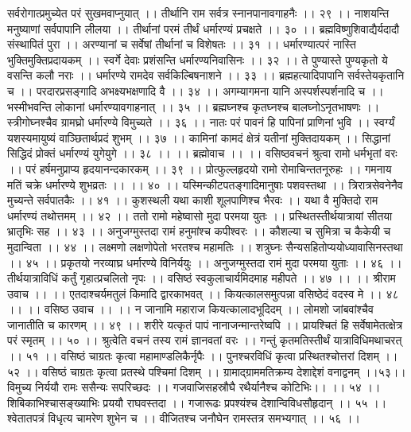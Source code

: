 सर्वरोगात्प्रमुच्येत परं सुखमवाप्नुयात् ।।
तीर्थानि राम सर्वत्र स्नानपानावगाहनैः ।। २९ ।।
नाशयन्ति मनुष्याणां सर्वपापानि लीलया ।।
तीर्थानां परमं तीर्थं धर्मारण्यं प्रचक्षते ।। ३० ।।
ब्रह्मविष्णुशिवाद्यैर्यदादौ संस्थापितं पुरा ।।
अरण्यानां च सर्वेषां तीर्थानां च विशेषतः ।। ३१ ।।
धर्मारण्यात्परं नास्ति भुक्तिमुक्तिप्रदायकम् ।।
स्वर्गे देवाः प्रशंसन्ति धर्मारण्यनिवासिनः ।। ३२ ।।
ते पुण्यास्ते पुण्यकृतो ये वसन्ति कलौ नराः ।।
धर्मारण्ये रामदेव सर्वकिल्बिषनाशने ।। ३३ ।।
ब्रह्महत्यादिपापानि सर्वस्तेयकृतानि च ।।
परदारप्रसङ्गादि अभक्ष्यभक्षणादि वै ।। ३४ ।।
अगम्यागमना यानि अस्पर्शस्पर्शनादि च ।।
भस्मीभवन्ति लोकानां धर्मारण्यावगाहनात् ।। ३५ ।।
ब्रह्मघ्नश्च कृतघ्नश्च बालघ्नोऽनृतभाषणः ।।
स्त्रीगोघ्नश्चैव ग्रामघ्रो धर्मारण्ये विमुच्यते ।। ३६ ।।
नातः परं पावनं हि पापिनां प्राणिनां भुवि ।।
स्वर्ग्यं यशस्यमायुष्यं वाञ्छितार्थप्रदं शुभम् ।। ३७ ।।
कामिनां कामदं क्षेत्रं यतीनां मुक्तिदायकम् ।।
सिद्धानां सिद्धिदं प्रोक्तं धर्मारण्यं युगेयुगे ।। ३८ ।।
।। ब्रह्मोवाच ।। ।।
वसिष्ठवचनं श्रुत्वा रामो धर्मभृतां वरः ।।
परं हर्षमनुप्राप्य हृदयानन्दकारकम् ।। ३९ ।।
प्रोत्फुल्लहृदयो रामो रोमाचिन्ततनूरुहः ।।
गमनाय मतिं चक्रे धर्मारण्ये शुभव्रतः ।। ।। ४० ।।
यस्मिन्कीटपतङ्गादिमानुषाः पशवस्तथा ।।
त्रिरात्रसेवनेनैव मुच्यन्ते सर्वपातकैः ।। ४१ ।।
कुशस्थली यथा काशी शूलपाणिश्च भैरवः ।।
यथा वै मुक्तिदो राम धर्मारण्यं तथोत्तमम् ।। ४२ ।।
ततो रामो महेष्वासो मुदा परमया युतः ।।
प्रस्थितस्तीर्थयात्रायां सीतया भ्रातृभिः सह ।। ४३ ।।
अनुजग्मुस्तदा रामं हनुमांश्च कपीश्वरः ।।
कौशल्या च सुमित्रा च कैकेयी च मुदान्विता ।। ४४ ।।
लक्ष्मणो लक्षणोपेतो भरतश्च महामतिः ।।
शत्रुघ्नः सैन्यसहितोप्ययोध्यावासिनस्तथा ।। ४५ ।।
प्रकृतयो नरव्याघ्र धर्मारण्ये विनिर्ययुः ।।
अनुजग्मुस्तदा रामं मुदा परमया युताः ।। ४६ ।।
तीर्थयात्राविधिं कर्तुं गृहात्प्रचलितो नृपः ।।
वसिष्ठं स्वकुलाचार्यमिदमाह महीपते ।। ४७ ।।
।। श्रीराम उवाच ।। ।।
एतदाश्चर्यमतुलं किमादि द्वारकाभवत् ।।
कियत्कालसमुत्पन्ना वसिष्ठेदं वदस्व मे ।। ४८ ।।
।। वसिष्ठ उवाच ।। ।।
न जानामि महाराज कियत्कालादभूदिदम् ।।
लोमशो जांबवांश्चैव जानातीति च कारणम् ।। ४९ ।।
शरीरे यत्कृतं पापं नानाजन्मान्तरेष्वपि ।।
प्रायश्चितं हि सर्वेषामेतत्क्षेत्र परं स्मृतम् ।। ५० ।।
श्रुत्वेति वचनं तस्य रामं ज्ञानवतां वरः ।।
गन्तुं कृतमतिस्तीर्थं यात्राविधिमथाचरत् ।। ५१ ।।
वसिष्ठं चाग्रतः कृत्वा महामाण्डलिकैर्नृपैः ।।
पुनश्चरविधिं कृत्वा प्रस्थितश्चोत्तरां दिशम् ।। ५२ ।।
वसिष्ठं चाग्रतः कृत्वा प्रतस्थे पश्चिमां दिशम् ।।
ग्रामाद्ग्राममतिक्रम्य देशाद्देशं वनाद्वनम् ।।५३।।
विमुच्य निर्ययौ रामः ससैन्यः सपरिच्छदः ।।
गजवाजिसहस्रौघै रथैर्यानैश्च कोटिभिः।। ।। ५४ ।।
शिबिकाभिश्चासङ्ख्याभिः प्रययौ राघवस्तदा ।।
गजारूढः प्रपश्यंश्च देशान्विविधसौहृदान् ।। ५५ ।।
श्वेतातपत्रं विधृत्य चामरेण शुभेन च ।।
वीजितश्च जनौघेन रामस्तत्र समभ्यगात् ।। ५६ ।।
